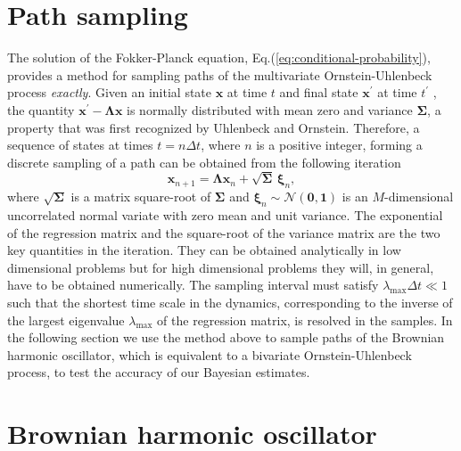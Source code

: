 \documentclass[english,aps, twocolumn, pre,superscriptaddress, notitlepage]{revtex4-1}
\begin{document}
\section{Path sampling\label{sec:Path-sampling}}

The solution of the Fokker-Planck equation, Eq.(\ref{eq:conditional-probability}),
provides a method for sampling paths of the multivariate Ornstein-Uhlenbeck
process \emph{exactly}. Given an initial state $\boldsymbol{x}$ at
time $t$ and final state $\boldsymbol{x}^{\prime}$ at time $t^{\prime}$
, the quantity $\boldsymbol{x}^{\prime}-\boldsymbol{\Lambda}\boldsymbol{x}$
is normally distributed with mean zero and variance $\boldsymbol{\Sigma}$,
a property that was first recognized by Uhlenbeck and Ornstein. Therefore,
a sequence of states at times $t=n\Delta t$, where $n$ is a positive
integer, forming a discrete sampling of a path can be obtained from
the following iteration \cite{uhlenbeck1930theory}
\begin{equation}
\boldsymbol{x}_{n+1}=\boldsymbol{\Lambda}\boldsymbol{x}_{n}+\sqrt{\boldsymbol{\Sigma}}\,\boldsymbol{\xi}_{n},\label{eq:path-sampling}
\end{equation}
where $\sqrt{\boldsymbol{\Sigma}}$ is a matrix square-root of $\boldsymbol{\Sigma}$
and $\boldsymbol{\xi}_{n}\sim\mathcal{N}(\boldsymbol{0},\boldsymbol{1})$
is an $M$-dimensional uncorrelated normal variate with zero mean
and unit variance. The exponential of the regression matrix and the
square-root of the variance matrix are the two key quantities in the
iteration. They can be obtained analytically in low dimensional problems
but for high dimensional problems they will, in general, have to be
obtained numerically. The sampling interval must satisfy $\lambda_{\mathrm{max}}\Delta t\ll1$
such that the shortest time scale in the dynamics, corresponding to
the inverse of the largest eigenvalue $\lambda_{\mathrm{max}}$ of
the regression matrix, is resolved in the samples. In the following
section we use the method above to sample paths of the Brownian harmonic
oscillator, which is equivalent to a bivariate Ornstein-Uhlenbeck
process, to test the accuracy of our Bayesian estimates.

\section{Brownian harmonic oscillator\label{sec:Brownian-harmonic-oscillator}}
\end{document}
